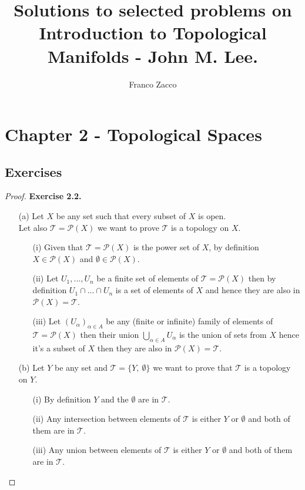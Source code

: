 \documentclass[11pt]{article}
\title{\textbf{Solutions to selected problems on Introduction to Topological Manifolds - John M. Lee.}}
\author{Franco Zacco}
\date{}
\newcommand{\Pow}{\mathcal{P}}
\newcommand{\Topo}{\mathcal{T}}
\theoremstyle{definition}
\begin{document}
\maketitle
\thispagestyle{empty}

\section*{Chapter 2 - Topological Spaces}

\subsection*{Exercises}

\begin{proof}{\textbf{Exercise 2.2.}}
    \begin{itemize}
    \item [(a)] Let $X$ be any set such that every subset of $X$ is open.\\
    Let also $\Topo = \Pow(X)$ we want to prove $\Topo$ is a topology on $X$.
    \begin{itemize}
        \item [(i)] Given that $\Topo = \Pow(X)$ is the power set of $X$, by
        definition $X \in \Pow(X)$ and $\emptyset\in\Pow(X)$.
        \item [(ii)] Let $U_1, ..., U_n$ be a finite set of elements
        of $\Topo = \Pow(X)$ then by definition $U_1 \cap ...\cap U_n$ is
        a set of elements of $X$ and hence they are also in
        $\Pow(X) = \Topo$.
        \item [(iii)]Let $(U_{\alpha})_{\alpha \in A}$ be any (finite or
        infinite) family of elements of $\Topo = \Pow(X)$ then their union
        $\bigcup_{\alpha \in A} U_\alpha$ is the union of sets from $X$
        hence it's a subset of $X$ then they are also in $\Pow(X) = \Topo$.
    \end{itemize}
    \item [(b)] Let $Y$ be any set and $\Topo = \{Y,~\emptyset\}$
    we want to prove that $\Topo$ is a topology on $Y$.
    \begin{itemize}
        \item [(i)] By definition $Y$ and the $\emptyset$ are in $\Topo$.
        \item [(ii)] Any intersection between elements of
        $\Topo$ is either $Y$ or $\emptyset$ and both of them are in $\Topo$.
        \item [(iii)] Any union between elements of
        $\Topo$ is either $Y$ or $\emptyset$ and both of them are in $\Topo$.

\end{itemize}
\end{itemize}
\end{proof}
\end{document}
